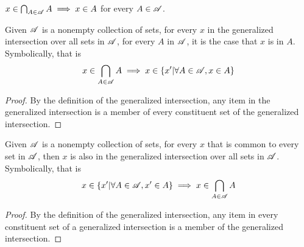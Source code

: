 \documentclass[main.tex]{subfiles}
\begin{document}
\subproblem{}\label{5d}

\(x \in \bigcap_{A \in \mathscr{A}} {A} \implies x \in A\) for
every \(A \in \mathscr{A}\).

\begin{thm}
	Given \(\mathscr{A}\) is a nonempty collection of sets, for every \(x\)
	in the generalized intersection over all sets in \(\mathscr{A}\), for
	every \(A\) in \(\mathscr{A}\), it is the case that \(x\) is in \(A\).
	Symbolically, that is
	\[x \in \bigcap\limits_{A \in \mathscr{A}} {A} \implies x \in \{x'|\forall A \in \mathscr{A}, x \in A\}\]
\end{thm}
\begin{proof}
	By the definition of the generalized intersection, any item in the
	generalized intersection is a member of every constituent set of the
	generalized intersection.
\end{proof}

\begin{thm}
	Given \(\mathscr{A}\) is a nonempty collection of sets, for every \(x\)
	that is common to every set in \(\mathscr{A}\), then \(x\) is also in
	the generalized intersection over all sets in \(\mathscr{A}\).
	Symbolically, that is
	\[x \in \{x'|\forall A \in \mathscr{A}, x' \in A\} \implies x \in \bigcap\limits_{A \in \mathscr{A}} {A}\]
\end{thm}
\begin{proof}
	By the definition of the generalized intersection, any item in every
	constituent set of a generalized intersection is a member of the
	generalized intersection.
\end{proof}
\end{document}

